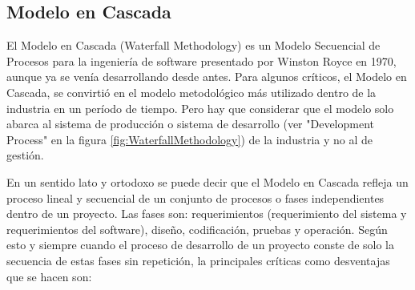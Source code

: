 \subsection{Modelo en Cascada}

El Modelo en Cascada (Waterfall Methodology) \cite{Ken-Schwaber-1995} es un Modelo Secuencial de Procesos para la ingeniería de software presentado por Winston Royce en 1970, aunque ya se venía desarrollando desde antes. Para algunos críticos, el Modelo en Cascada, se convirtió en el modelo metodológico más utilizado dentro de la industria en un período de tiempo. Pero hay que considerar que el modelo solo abarca al sistema de producción o sistema de desarrollo (ver "Development Process" en la figura \ref{fig:WaterfallMethodology}) de la industria y no al de gestión.

En un sentido lato y ortodoxo se puede decir que el Modelo en Cascada refleja un proceso lineal y secuencial de un conjunto de procesos o fases independientes dentro de un proyecto. Las fases son: requerimientos (requerimiento del sistema y requerimientos del software), diseño, codificación, pruebas y operación. Según esto y siempre cuando el proceso de desarrollo de un proyecto conste de solo la secuencia de estas fases sin repetición, la principales críticas como desventajas que se hacen son:

